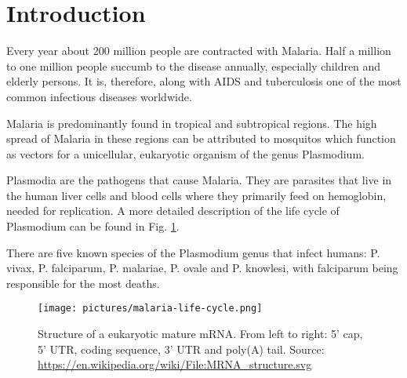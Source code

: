 \section{Introduction}
Every year about 200 million people are contracted with Malaria. Half a million to one million people succumb to the disease annually, especially children and elderly persons. It is, therefore, along with AIDS and tuberculosis one of the most common infectious diseases worldwide. 

Malaria is predominantly found in tropical and subtropical regions. The high spread of Malaria in these regions can be attributed to mosquitos which function as vectors for a unicellular, eukaryotic organism of the genus Plasmodium. 

Plasmodia are the pathogens that cause Malaria. They are parasites that live in the human liver cells and blood cells where they primarily feed on hemoglobin, needed for replication. A more detailed description of the life cycle of Plasmodium can be found in Fig. \ref{plasmodium_life_cycle}.

There are five known species of the Plasmodium genus that infect humans: P. vivax, P. falciparum, P. malariae, P. ovale and P. knowlesi, with falciparum being responsible for the most deaths. 


\begin{figure}[ht!]
	\centering
	\centerline{\texttt{[image: pictures/malaria-life-cycle.png]}}
	\caption[Life cycle of Plasmodia]{Structure of a eukaryotic mature mRNA. From left to right: 5' cap, 5' UTR, coding sequence, 3' UTR and poly(A) tail. Source: \url{https://en.wikipedia.org/wiki/File:MRNA_structure.svg}}
	\label{plasmodium_life_cycle}
\end{figure}

